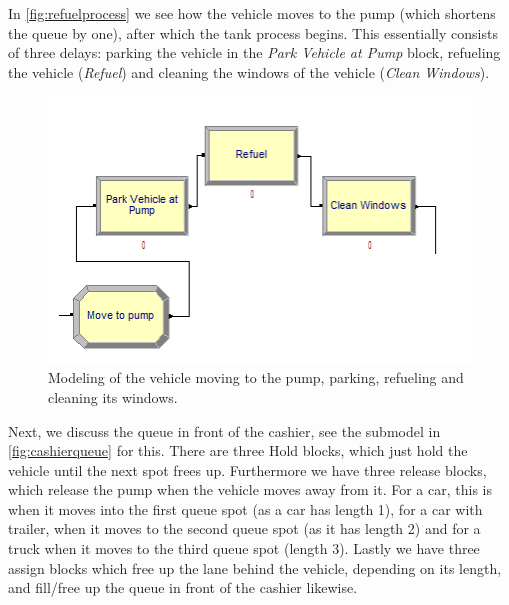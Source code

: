 In \autoref{fig:refuelprocess} we see how the vehicle moves to the pump (which shortens the queue by one), after which the tank process begins. 
This essentially consists of three delays: parking the vehicle in the \textit{Park Vehicle at Pump} block, refueling the vehicle (\textit{Refuel}) and cleaning the windows of the vehicle (\textit{Clean Windows}).

\begin{figure}[h]
\begin{center}
	\includegraphics[scale=0.8]{images/model-description/refuel-process.PNG}
	\caption{Modeling of the vehicle moving to the pump, parking, refueling and cleaning its windows.}
	\label{fig:refuelprocess}
\end{center}
\end{figure}

Next, we discuss the queue in front of the cashier, see the submodel in \autoref{fig:cashierqueue} for this. 
There are three Hold blocks, which just hold the vehicle until the next spot frees up. 
Furthermore we have three release blocks, which release the pump when the vehicle moves away from it. 
For a car, this is when it moves into the first queue spot (as a car has length 1), for a car with trailer, when it moves to the second queue spot (as it has length 2) and for a truck when it moves to the third queue spot (length 3). 
Lastly we have three assign blocks which free up the lane behind the vehicle, depending on its length, and fill/free up the queue in front of the cashier likewise.

